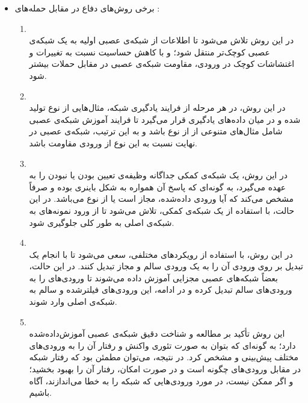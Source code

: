 \documentclass[a4paper]{article}
\begin{document}
	\begin{itemize}
		\item 
		برخی روش‌های دفاع در مقابل حمله‌های :
		\begin{enumerate} [label=\arabic*-]
		\item 
		\\
		در این روش تلاش می‌شود تا اطلاعات از شبکه‌ی عصبی اولیه به یک شبکه‌ی عصبی کوچک‌تر منتقل شود؛ و با کاهش حساسیت نسبت به تغییرات و اغتشاشات کوچک در ورودی، مقاومت شبکه‌ی عصبی در مقابل حملات  بیشتر شود.\\
		
		\item 
		\\
		در این روش، در هر مرحله از فرایند یادگیری شبکه، مثال‌هایی از نوع  تولید شده و در میان داده‌های یادگیری قرار می‌گیرد تا فرایند آموزش شبکه‌ی عصبی شامل مثال‌های متنوعی از از نوع   باشد و به این ترتیب، شبکه‌ی عصبی در نهایت نسبت به این نوع از ورودی مقاومت باشد.\\
		
		\item
		\\
		در این روش، یک شبکه‌ی کمکی جداگانه وظیفه‌ی تعیین  بودن یا نبودن را به عهده می‌گیرد، به گونه‌ای که پاسخ آن همواره به شکل باینری بوده و صرفاً مشخص می‌کند که آیا ورودی داده‌شده، مجاز است یا از نوع  می‌باشد. در این حالت، با استفاده از یک شبکه‌ی کمکی، تلاش می‌شود تا از ورود نمونه‌های  به شبکه‌ی اصلی به طور کلی جلوگیری شود.\\
		
		\item 
		\\
		در این روش، با استفاده از رویکردهای مختلفی، سعی می‌شود تا با انجام یک تبدیل بر روی ورودی  آن را به یک ورودی سالم و مجاز تبدیل کنند. در این حالت، بعضاً شبکه‌های عصبی مجزایی آموزش داده می‌شوند تا ورودی‌های  را به ورودی‌های سالم تبدیل کرده و در ادامه، این ورودی‌های فیلترشده و سالم به شبکه‌ی اصلی وارد شوند.
		\\
		
		\item 
		\\
		این روش تأکید بر مطالعه و شناخت دقیق شبکه‌ی عصبی آموزش‌داده‌شده دارد؛ به گونه‌ای که بتوان به صورت تئوری واکنش و رفتار آن را به ورودی‌های مختلف پیش‌بینی و مشخص کرد. در نتیجه، می‌توان مطمئن بود که رفتار شبکه در مقابل ورودی‌های  چگونه است و در صورت امکان، رفتار آن را بهبود بخشید؛ و اگر ممکن نیست، در مورد ورودی‌هایی که شبکه را به خطا می‌اندازند، آگاه باشیم.\\
		

\end{enumerate}
\end{itemize}
\end{document}
